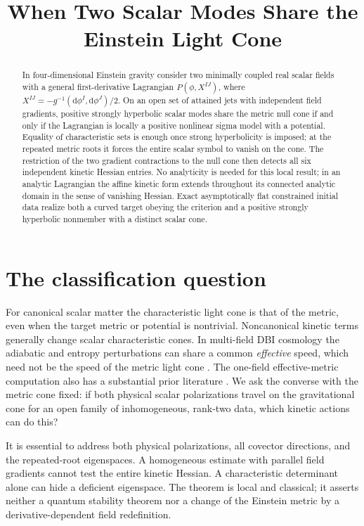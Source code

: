\documentclass[11pt]{article}
\title{When Two Scalar Modes Share the Einstein Light Cone}
\author{}
\date{}
\newcommand{\dd}{\mathrm d}
\begin{document}
\maketitle

\begin{abstract}
In four-dimensional Einstein gravity consider two minimally coupled real scalar fields with a general first-derivative Lagrangian \(P(\phi,X^{IJ})\), where \(X^{IJ}=-g^{-1}(\dd\phi^I,\dd\phi^J)/2\). On an open set of attained jets with independent field gradients, positive strongly hyperbolic scalar modes share the metric null cone if and only if the Lagrangian is locally a positive nonlinear sigma model with a potential. Equality of characteristic sets is enough once strong hyperbolicity is imposed; at the repeated metric roots it forces the entire scalar symbol to vanish on the cone. The restriction of the two gradient contractions to the null cone then detects all six independent kinetic Hessian entries. No analyticity is needed for this local result; in an analytic Lagrangian the affine kinetic form extends throughout its connected analytic domain in the sense of vanishing Hessian. Exact asymptotically flat constrained initial data realize both a curved target obeying the criterion and a positive strongly hyperbolic nonmember with a distinct scalar cone.
\end{abstract}

\section{The classification question}
For canonical scalar matter the characteristic light cone is that of the metric, even when the target metric or potential is nontrivial. Noncanonical kinetic terms generally change scalar characteristic cones. In multi-field DBI cosmology the adiabatic and entropy perturbations can share a common \emph{effective} speed, which need not be the speed of the metric light cone \cite{LRST}. The one-field effective-metric computation also has a substantial prior literature \cite{BMV,Rendall}. We ask the converse with the metric cone fixed: if both physical scalar polarizations travel on the gravitational cone for an open family of inhomogeneous, rank-two data, which kinetic actions can do this?

It is essential to address both physical polarizations, all covector directions, and the repeated-root eigenspaces. A homogeneous estimate with parallel field gradients cannot test the entire kinetic Hessian. A characteristic determinant alone can hide a deficient eigenspace. The theorem is local and classical; it asserts neither a quantum stability theorem nor a change of the Einstein metric by a derivative-dependent field redefinition.
\end{document}
